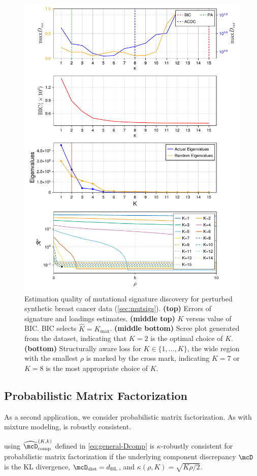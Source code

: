 \begin{figure}[h!]
	\centering
	\includegraphics[width=.8\textwidth]{figures/composite-multdiv-600-breast-custom-seed-1-perturbed-0.0025.pdf}
	\caption{
	Estimation quality of mutational signature discovery for
	perturbed synthetic breast cancer data (\cref{sec:mutsigs}).
	\textbf{(top)} Errors of signature and loadings estimates.
	\textbf{(middle top)} $K$ versus value of BIC. BIC selects $\widehat K=K_{\max}$.
	\textbf{(middle bottom)} Scree plot generated from the dataset, indicating that $K = 2$ is the optimal choice of $K$.
	\textbf{(bottom)} Structurally aware loss for $K\in \{1,\dots,K\}$, the wide region with the smallest $\rho$ is marked by the cross mark, indicating $K=7$ or $K=8$ is the most appropriate choice of $K$.
	}
	\label{fig:mutsig_result}
\end{figure}

\subsection{Probabilistic Matrix Factorization} \label{sec:pmf-applications}

As a second application, we consider probabilistic matrix factorization.
As with mixture modeling, \methodname is robustly consistent. 
\begin{theorem} \label{thm:pmf-robust-consistency}
\methodname using $\compDiscEst^{(K,k)}$ defined in \cref{eq:general-Dcomp} is $\kappa$-robustly consistent for probabilistic matrix factorization if the underlying component discrepancy $\mcD$ is the KL divergence,  $\distDisc = d_\mathrm{BL}$, and $\kappa(\rho, K) = \sqrt{K\rho/2}$. 
\end{theorem}

